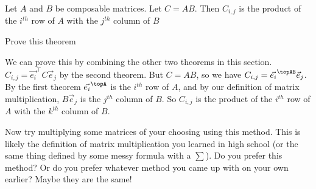 \documentclass{ximera}
\begin{document}
\begin{theorem}
	Let $A$ and $B$ be composable matrices.  Let $C=AB$.  Then $C_{i,j}$ is the product of the $i^{th}$ row of $A$ with the $j^{th}$ column of $B$
\end{theorem}

Prove this theorem
\begin{free-response}
	We can prove this by combining the other two theorems in this section.  $C_{i,j} = \vec{e_i}^\top C \vec{e}_j$ by the second theorem.  But $C = AB$, so we have 
	$C_{i,j} = \vec{e_i}^\topAB\vec{e}_j$.  By the first theorem $\vec{e_i}^\topA$ is the $i^{th}$ row of $A$, and by our definition of matrix multiplication, 
	$B\vec{e}_j$ is the $j^{th}$ column of $B$. So $C_{i,j}$ is the product of the $i^{th}$ row of $A$ with the $k^{th}$ column of $B$.
\end{free-response}

Now try multiplying some matrices of your choosing using this method.  This is likely the definition of matrix multiplication you learned in high school (or the same thing
defined by some messy formula with a $\sum$).  Do you prefer this method?  Or do you prefer whatever method you came up with on your own earlier?  
Maybe they are the same!
  
	
\end{document}
